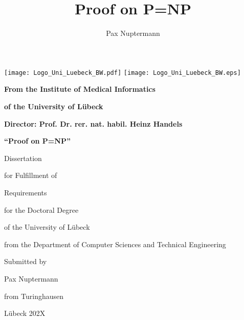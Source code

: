 \newcommand{\myTitle}{Proof on P=NP}
\newcommand{\myName}{Pax Nuptermann}
\title{\myTitle}


\author{\myName}

\begin{titlepage}%
	\noindent
\ifpdf	
	\texttt{[image: Logo\_Uni\_Luebeck\_BW.pdf]}	%
\else
	\texttt{[image: Logo\_Uni\_Luebeck\_BW.eps]}	%
\fi
	
	\centering
	\vspace{1.0cm}
	
	\large
	
	{\bf From the Institute of Medical Informatics \par}
	{\bf of the University of Lübeck \par}
	{\bf Director: Prof. Dr. rer. nat. habil. Heinz Handels \par}
	
	\vfill
	
	{\bf \Large ``\myTitle'' \par}
	
	\vspace{0.5cm}
	
	{Dissertation \par}
	{for Fulfillment of \par}
	{Requirements \par}
	{for the Doctoral Degree \par}
	{of the University of Lübeck \par}
		
	\vspace{0.5cm}
		
	{from the Department of Computer Sciences and Technical Engineering \par}
	
	\vfill
	
	{Submitted by \par}
	\vspace{0.5cm}
	{\myName \par}
	{from Turinghausen \par}
	\vspace{0.5cm}
	{Lübeck 202X \par}
	
	
\end{titlepage}


\thispagestyle{empty}

